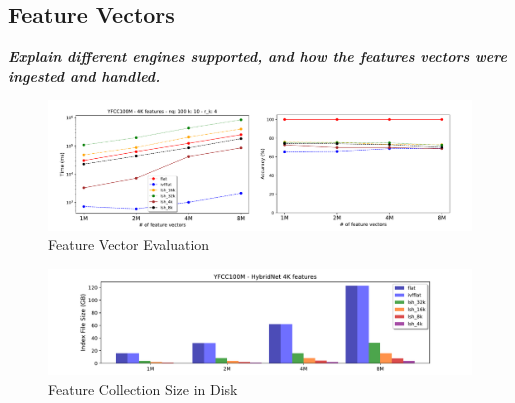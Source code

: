 \subsection{Feature Vectors}

\textbf{\textit{Explain different engines supported, and how the features vectors
were ingested and handled.}}

\begin{figure}[]
\centering
\includegraphics[width=\textwidth]{figures/features_alternatives}
\caption{Feature Vector Evaluation}
\label{fig:features_eval}
\end{figure}

\begin{figure}[]
\centering
\includegraphics[width=\textwidth]{figures/features_disksize}
\caption{Feature Collection Size in Disk}
\label{fig:features_size_does_matter}
\end{figure}

